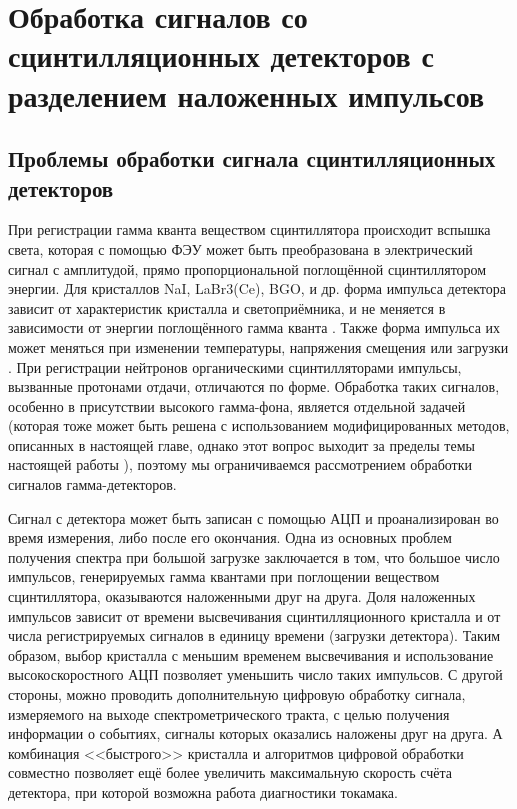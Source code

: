 \chapter{Обработка сигналов со сцинтилляционных детекторов с разделением наложенных импульсов}
\label{ch:ch2}


\section{Проблемы обработки сигнала сцинтилляционных детекторов}

При регистрации гамма кванта веществом сцинтиллятора происходит вспышка света, которая с помощью ФЭУ может быть преобразована в электрический сигнал с амплитудой, прямо пропорциональной поглощённой сцинтиллятором энергии. Для кристаллов NaI, LaBr3(Ce), BGO, и др. форма импульса детектора зависит от характеристик кристалла и светоприёмника, и не меняется в зависимости от энергии поглощённого гамма кванта \cite{Gin2008}. Также форма импульса их может меняться при изменении температуры, напряжения смещения или загрузки \cite{Renker2009,Grodzicka2015}. При регистрации нейтронов органическими сцинтилляторами импульсы, вызванные протонами отдачи, отличаются по форме.  Обработка таких сигналов, особенно в присутствии высокого гамма-фона, является отдельной задачей (которая тоже может быть решена с использованием модифицированных методов, описанных в настоящей главе, однако этот вопрос выходит за пределы темы настоящей работы \cite{Iliasova2020}), поэтому мы ограничиваемся рассмотрением обработки сигналов гамма-детекторов. 

Сигнал с детектора может быть записан с помощью АЦП и проанализирован во время измерения, либо после его окончания. Одна из основных проблем получения спектра при большой загрузке заключается в том, что большое число импульсов, генерируемых гамма квантами при поглощении веществом сцинтиллятора, оказываются наложенными друг на друга. Доля наложенных импульсов зависит от времени высвечивания сцинтилляционного кристалла и от числа регистрируемых сигналов в единицу времени (загрузки детектора). Таким образом, выбор кристалла с меньшим временем высвечивания и использование высокоскоростного АЦП позволяет уменьшить число таких импульсов. С другой стороны, можно проводить дополнительную цифровую обработку сигнала, измеряемого на выходе спектрометрического тракта, с целью получения информации о событиях, сигналы которых оказались наложены друг на друга. А комбинация <<быстрого>> кристалла и алгоритмов цифровой обработки совместно позволяет ещё более увеличить максимальную скорость счёта детектора, при которой возможна работа диагностики токамака.

